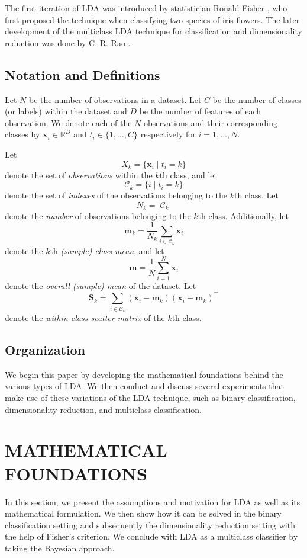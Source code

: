\documentclass[letterpaper, 10 pt, conference]{ieeeconf}  %
\newcommand{\ve}[1]{\mathbf{#1}}
\begin{document}
The first iteration of LDA was introduced by statistician Ronald Fisher \autocite{fisher}, who first proposed the technique when classifying two species of iris flowers. The later development of the multiclass LDA technique for classification and dimensionality reduction was done by C. R. Rao \autocite{rao}.

\subsection{Notation and Definitions} \label{subsec:notdef}
Let $N$ be the number of observations in a dataset. Let $C$ be the number of classes (or labels) within the dataset and $D$ be the number of features of each observation. We denote each of the $N$ observations and their corresponding classes by $\ve{x}_i \in \mathbb{R}^D$ and $t_i \in \{1,\ldots,C\}$ respectively for $i=1,\ldots,N$.

Let $$X_k = \{\ve{x}_i \mid t_i = k\}$$ denote the set of \textit{observations} within the $k$th class, and let $$\mathcal{C}_k = \{i \mid t_i = k\}$$ denote the set of \textit{indexes} of the observations belonging to the $k$th class.
Let $$N_k = |\mathcal{C}_k|$$ denote the \textit{number} of observations belonging to the $k$th class.
Additionally, let $$\ve{m}_k = \frac{1}{N_k}\sum_{i \in \mathcal{C}_k} \ve{x}_i$$ denote the $k$th \textit{(sample) class mean}, and let $$\ve{m} = \frac{1}{N}\sum_{i=1}^N\ve{x}_i$$ denote the \textit{overall (sample) mean} of the dataset. Let $$\ve{S}_k = \sum_{i \in \mathcal{C}_k} (\ve{x}_i - \ve{m}_k)(\ve{x}_i - \ve{m}_k)^{\top}$$ denote the \textit{within-class scatter matrix} of the $k$th class.

\subsection{Organization}
We begin this paper by developing the mathematical foundations behind the various types of LDA. We then conduct and discuss several experiments that make use of these variations of the LDA technique, such as binary classification, dimensionality reduction, and multiclass classification.


\section{MATHEMATICAL FOUNDATIONS}\label{sec:foundations}
In this section, we present the assumptions and motivation for LDA as well as its mathematical formulation. We then show how it can be solved in the binary classification setting and subsequently the dimensionality reduction setting with the help of Fisher's criterion.
We conclude with LDA as a multiclass classifier by taking the Bayesian approach.
\end{document}
